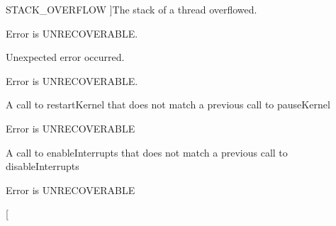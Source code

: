 \begin{Desc}
\begin{description}
{\hypertarget{namespacemiosix_ac0146189e7df18439dc2f4103f07cfe8a772bd51dfe3b2db17e618c589e55e3b8}{S\-T\-A\-C\-K\-\_\-\-O\-V\-E\-R\-F\-L\-O\-W}\label{namespacemiosix_ac0146189e7df18439dc2f4103f07cfe8a772bd51dfe3b2db17e618c589e55e3b8}
}]The stack of a thread overflowed.\par
Error is U\-N\-R\-E\-C\-O\-V\-E\-R\-A\-B\-L\-E. \item[{\em 
\hypertarget{namespacemiosix_ac0146189e7df18439dc2f4103f07cfe8a047868d81b859f0eda3d4a172900e4d6}{U\-N\-E\-X\-P\-E\-C\-T\-E\-D}\label{namespacemiosix_ac0146189e7df18439dc2f4103f07cfe8a047868d81b859f0eda3d4a172900e4d6}
}]Unexpected error occurred.\par
Error is U\-N\-R\-E\-C\-O\-V\-E\-R\-A\-B\-L\-E. \item[{\em 
\hypertarget{namespacemiosix_ac0146189e7df18439dc2f4103f07cfe8aba75de60056149f80f47ed9b2249fdf2}{P\-A\-U\-S\-E\-\_\-\-K\-E\-R\-N\-E\-L\-\_\-\-N\-E\-S\-T\-I\-N\-G}\label{namespacemiosix_ac0146189e7df18439dc2f4103f07cfe8aba75de60056149f80f47ed9b2249fdf2}
}]A call to restart\-Kernel that does not match a previous call to pause\-Kernel\par
Error is U\-N\-R\-E\-C\-O\-V\-E\-R\-A\-B\-L\-E \item[{\em 
\hypertarget{namespacemiosix_ac0146189e7df18439dc2f4103f07cfe8a7b868b4e1fd949857af27acacd2f9cbb}{D\-I\-S\-A\-B\-L\-E\-\_\-\-I\-N\-T\-E\-R\-R\-U\-P\-T\-S\-\_\-\-N\-E\-S\-T\-I\-N\-G}\label{namespacemiosix_ac0146189e7df18439dc2f4103f07cfe8a7b868b4e1fd949857af27acacd2f9cbb}
}]A call to enable\-Interrupts that does not match a previous call to disable\-Interrupts\par
Error is U\-N\-R\-E\-C\-O\-V\-E\-R\-A\-B\-L\-E \item[{\em 
}
\end{description}
\end{Desc}
